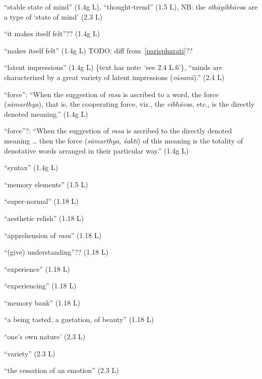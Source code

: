 \documentclass[10pt]{article}
\begin{document}
\begin{multicols}{2}
\begin{enumerate}[
			leftmargin=0em,
			rightmargin=0em,
		]
		 ``stable state of mind'' (1.4g L),
		``thought-trend'' (1.5 L), %
		NB: the \textit{sthāyibhāva}s are a type of `state of mind' (2.3 L)

		 ``it makes itself felt''?? (1.4g L)

		 ``makes itself felt'' (1.4g L) TODO: diff from~\ref{parisphurati}??

		 ``latent impressions'' (1.4g L) \{text has note: `see 2.4 L.6'\},
		``minds are characterized by a great variety of latent impressions (\textit{vāsanā}).'' (2.4 L)

		 ``force'': ``When the suggestion of \textit{rasa} is ascribed to a word, the force (\textit{sāmarthya}), that is, the cooperating force, viz., the \textit{vibhāva}s, etc., is the directly denoted meaning.'' (1.4g L)

		 ``force''?: ``When the suggestion of \textit{rasa} is ascribed to the directly denoted meaning \dots
		then the force (\textit{sāmarthya}, \textit{śakti}) of this meaning is the totality of denotative words arranged in their particular way.'' (1.4g L)

		 ``syntax'' (1.4g L)

		\litem{-------} ``memory elements'' (1.5 L)

		 ``super-normal'' (1.18 L)

		 ``aesthetic relish'' (1.18 L)

		 ``apprehension of \textit{rasa}'' (1.18 L)

		 ``(give) understanding''?? (1.18 L)

		 ``experience'' (1.18 L)

		 ``experiencing'' (1.18 L)

		 ``memory bank'' (1.18 L)

		 ``a being tasted, a gustation, of beauty'' (1.18 L)

		 ``one's own nature' (2.3 L)

		 ``variety'' (2.3 L)

		 ``the cessation of an emotion'' (2.3 L)


\end{enumerate}
\end{multicols}
\end{document}
